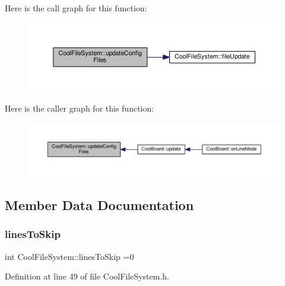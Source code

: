 Here is the call graph for this function\+:
\nopagebreak
\begin{figure}[H]
\begin{center}
\leavevmode
\includegraphics[width=350pt]{db/d0c/class_cool_file_system_adfa8e2e80641ae6f0cceabd348a9b841_cgraph}
\end{center}
\end{figure}
Here is the caller graph for this function\+:
\nopagebreak
\begin{figure}[H]
\begin{center}
\leavevmode
\includegraphics[width=350pt]{db/d0c/class_cool_file_system_adfa8e2e80641ae6f0cceabd348a9b841_icgraph}
\end{center}
\end{figure}


\subsection{Member Data Documentation}
\mbox{\label{class_cool_file_system_a84fdb6057e534b395512463daa28ea3c}} 
\subsubsection{\texorpdfstring{lines\+To\+Skip}{linesToSkip}}
{\footnotesize\ttfamily int Cool\+File\+System\+::lines\+To\+Skip =0\hspace{0.3cm}{\ttfamily [private]}}



Definition at line 49 of file Cool\+File\+System.\+h.

\mbox{\label{class_cool_file_system_ad9f5b739a32100f5f21270c3d9ee2b1d}} 
